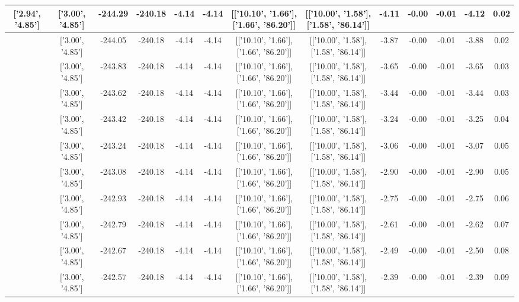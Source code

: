 \begin{table}[htbp]
\begin{adjustbox}{angle=90}
\begin{tabular}{|c|c|c|c|c|c|c|c|c|c|c|c|c|}
 ['2.94', '4.85'] & ['3.00', '4.85'] & -244.29 & -240.18 & -4.14 & -4.14 & [['10.10', '1.66'], ['1.66', '86.20']] & [['10.00', '1.58'], ['1.58', '86.14']] & -4.11 & -0.00 & -0.01 & -4.12 & 0.02\\ \hline
 ['2.94', '4.85'] & ['3.00', '4.85'] & -244.05 & -240.18 & -4.14 & -4.14 & [['10.10', '1.66'], ['1.66', '86.20']] & [['10.00', '1.58'], ['1.58', '86.14']] & -3.87 & -0.00 & -0.01 & -3.88 & 0.02\\ \hline
 ['2.94', '4.85'] & ['3.00', '4.85'] & -243.83 & -240.18 & -4.14 & -4.14 & [['10.10', '1.66'], ['1.66', '86.20']] & [['10.00', '1.58'], ['1.58', '86.14']] & -3.65 & -0.00 & -0.01 & -3.65 & 0.03\\ \hline
 ['2.95', '4.85'] & ['3.00', '4.85'] & -243.62 & -240.18 & -4.14 & -4.14 & [['10.10', '1.66'], ['1.66', '86.20']] & [['10.00', '1.58'], ['1.58', '86.14']] & -3.44 & -0.00 & -0.01 & -3.44 & 0.03\\ \hline
 ['2.95', '4.85'] & ['3.00', '4.85'] & -243.42 & -240.18 & -4.14 & -4.14 & [['10.10', '1.66'], ['1.66', '86.20']] & [['10.00', '1.58'], ['1.58', '86.14']] & -3.24 & -0.00 & -0.01 & -3.25 & 0.04\\ \hline
 ['2.96', '4.85'] & ['3.00', '4.85'] & -243.24 & -240.18 & -4.14 & -4.14 & [['10.10', '1.66'], ['1.66', '86.20']] & [['10.00', '1.58'], ['1.58', '86.14']] & -3.06 & -0.00 & -0.01 & -3.07 & 0.05\\ \hline
 ['2.96', '4.85'] & ['3.00', '4.85'] & -243.08 & -240.18 & -4.14 & -4.14 & [['10.10', '1.66'], ['1.66', '86.20']] & [['10.00', '1.58'], ['1.58', '86.14']] & -2.90 & -0.00 & -0.01 & -2.90 & 0.05\\ \hline
 ['2.96', '4.85'] & ['3.00', '4.85'] & -242.93 & -240.18 & -4.14 & -4.14 & [['10.10', '1.66'], ['1.66', '86.20']] & [['10.00', '1.58'], ['1.58', '86.14']] & -2.75 & -0.00 & -0.01 & -2.75 & 0.06\\ \hline
 ['2.97', '4.85'] & ['3.00', '4.85'] & -242.79 & -240.18 & -4.14 & -4.14 & [['10.10', '1.66'], ['1.66', '86.20']] & [['10.00', '1.58'], ['1.58', '86.14']] & -2.61 & -0.00 & -0.01 & -2.62 & 0.07\\ \hline
 ['2.97', '4.85'] & ['3.00', '4.85'] & -242.67 & -240.18 & -4.14 & -4.14 & [['10.10', '1.66'], ['1.66', '86.20']] & [['10.00', '1.58'], ['1.58', '86.14']] & -2.49 & -0.00 & -0.01 & -2.50 & 0.08\\ \hline
 ['2.97', '4.85'] & ['3.00', '4.85'] & -242.57 & -240.18 & -4.14 & -4.14 & [['10.10', '1.66'], ['1.66', '86.20']] & [['10.00', '1.58'], ['1.58', '86.14']] & -2.39 & -0.00 & -0.01 & -2.39 & 0.09\\ \hline

\end{tabular}
\end{adjustbox}
\end{table}
